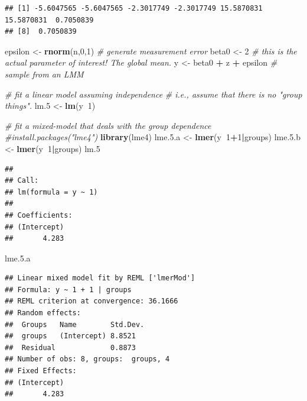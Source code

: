 \documentclass[]{book}
\newenvironment{Shaded}{\begin{snugshade}}{\end{snugshade}}
\newcommand{\KeywordTok}[1]{\textcolor[rgb]{0.13,0.29,0.53}{\textbf{#1}}}
\newcommand{\DecValTok}[1]{\textcolor[rgb]{0.00,0.00,0.81}{#1}}
\newcommand{\FloatTok}[1]{\textcolor[rgb]{0.00,0.00,0.81}{#1}}
\newcommand{\StringTok}[1]{\textcolor[rgb]{0.31,0.60,0.02}{#1}}
\newcommand{\CommentTok}[1]{\textcolor[rgb]{0.56,0.35,0.01}{\textit{#1}}}
\newcommand{\OperatorTok}[1]{\textcolor[rgb]{0.81,0.36,0.00}{\textbf{#1}}}
\newcommand{\NormalTok}[1]{#1}
\begin{document}
\begin{verbatim}
## [1] -5.6047565 -5.6047565 -2.3017749 -2.3017749 15.5870831 15.5870831  0.7050839
## [8]  0.7050839
\end{verbatim}

\begin{Shaded}
\begin{Highlighting}[]
\NormalTok{epsilon <-}\StringTok{ }\KeywordTok{rnorm}\NormalTok{(n,}\DecValTok{0}\NormalTok{,}\DecValTok{1}\NormalTok{) }\CommentTok{# generate measurement error}
\NormalTok{beta0 <-}\StringTok{ }\DecValTok{2} \CommentTok{# this is the actual parameter of interest! The global mean.}
\NormalTok{y <-}\StringTok{ }\NormalTok{beta0 }\OperatorTok{+}\StringTok{ }\NormalTok{z }\OperatorTok{+}\StringTok{ }\NormalTok{epsilon }\CommentTok{# sample from an LMM}

\CommentTok{# fit a linear model assuming independence}
\CommentTok{# i.e., assume that there is no "group things".}
\NormalTok{lm.}\DecValTok{5}\NormalTok{ <-}\StringTok{ }\KeywordTok{lm}\NormalTok{(y}\OperatorTok{~}\DecValTok{1}\NormalTok{)}

\CommentTok{# fit a mixed-model that deals with the group dependence}
\CommentTok{#install.packages("lme4")}
\KeywordTok{library}\NormalTok{(lme4)}
\NormalTok{lme.}\FloatTok{5.}\NormalTok{a <-}\StringTok{ }\KeywordTok{lmer}\NormalTok{(y}\OperatorTok{~}\DecValTok{1}\OperatorTok{+}\DecValTok{1}\OperatorTok{|}\NormalTok{groups) }
\NormalTok{lme.}\FloatTok{5.}\NormalTok{b <-}\StringTok{ }\KeywordTok{lmer}\NormalTok{(y}\OperatorTok{~}\DecValTok{1}\OperatorTok{|}\NormalTok{groups) }
\NormalTok{lm.}\DecValTok{5}
\end{Highlighting}
\end{Shaded}

\begin{verbatim}
## 
## Call:
## lm(formula = y ~ 1)
## 
## Coefficients:
## (Intercept)  
##       4.283
\end{verbatim}

\begin{Shaded}
\begin{Highlighting}[]
\NormalTok{lme.}\FloatTok{5.}\NormalTok{a }
\end{Highlighting}
\end{Shaded}

\begin{verbatim}
## Linear mixed model fit by REML ['lmerMod']
## Formula: y ~ 1 + 1 | groups
## REML criterion at convergence: 36.1666
## Random effects:
##  Groups   Name        Std.Dev.
##  groups   (Intercept) 8.8521  
##  Residual             0.8873  
## Number of obs: 8, groups:  groups, 4
## Fixed Effects:
## (Intercept)  
##       4.283
\end{verbatim}
\end{document}
